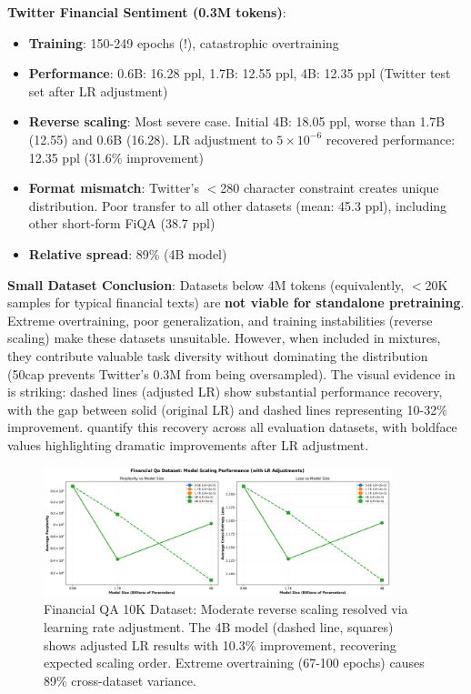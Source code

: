 \textbf{Twitter Financial Sentiment (0.3M tokens)}:
\begin{itemize}
\item \textbf{Training}: 150-249 epochs (!), catastrophic overtraining
\item \textbf{Performance}: 0.6B: 16.28 ppl, 1.7B: 12.55 ppl, 4B: 12.35 ppl (Twitter test set after LR adjustment)
\item \textbf{Reverse scaling}: Most severe case. Initial 4B: 18.05 ppl, worse than 1.7B (12.55) and 0.6B (16.28). LR adjustment to $5 \times 10^{-6}$ recovered performance: 12.35 ppl (31.6\% improvement)
\item \textbf{Format mismatch}: Twitter's $<$280 character constraint creates unique distribution. Poor transfer to all other datasets (mean: 45.3 ppl), including other short-form FiQA (38.7 ppl)
\item \textbf{Relative spread}: 89\% (4B model)
\end{itemize}

\textbf{Small Dataset Conclusion}: Datasets below 4M tokens (equivalently, $<$20K samples for typical financial texts) are \textbf{not viable for standalone pretraining}. Extreme overtraining, poor generalization, and training instabilities (reverse scaling) make these datasets unsuitable. However, when included in mixtures, they contribute valuable task diversity without dominating the distribution (50cap prevents Twitter's 0.3M from being oversampled). The visual evidence in  is striking: dashed lines (adjusted LR) show substantial performance recovery, with the gap between solid (original LR) and dashed lines representing 10-32\% improvement.  quantify this recovery across all evaluation datasets, with boldface values highlighting dramatic improvements after LR adjustment.

\begin{figure}[h]
\centering
\includegraphics[width=0.9\textwidth]{figures/scaling_financial_qa.png}
\caption[Financial QA 10K Dataset: Reverse Scaling]{Financial QA 10K Dataset: Moderate reverse scaling resolved via learning rate adjustment. The 4B model (dashed line, squares) shows adjusted LR results with 10.3\% improvement, recovering expected scaling order. Extreme overtraining (67-100 epochs) causes 89\% cross-dataset variance.}
\label{fig:scaling_financial_qa}
\end{figure}

